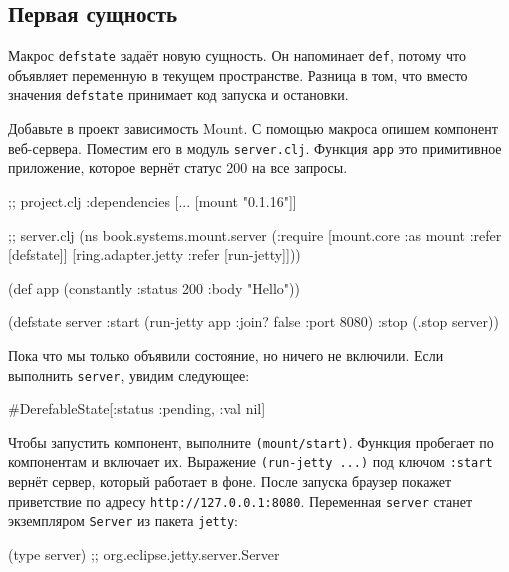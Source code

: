 \subsection{Первая сущность}


Макрос \verb|defstate| задаёт новую сущность. Он напоминает \verb|def|,
потому что объявляет переменную в текущем пространстве. Разница в том, что
вместо значения \verb|defstate| принимает код запуска и остановки.

Добавьте в проект зависимость Mount. С помощью макроса опишем компонент
веб-сервера. Поместим его в модуль \verb|server.clj|. Функция \verb|app| это
примитивное приложение, которое вернёт статус 200 на все запросы.


\begin{english}
  \begin{clojure}
;; project.clj
:dependencies [... [mount "0.1.16"]]

;; server.clj
(ns book.systems.mount.server
  (:require
   [mount.core :as mount :refer [defstate]]
   [ring.adapter.jetty :refer [run-jetty]]))

(def app (constantly {:status 200 :body "Hello"}))

(defstate server
  :start (run-jetty app {:join? false :port 8080})
  :stop (.stop server))
  \end{clojure}
\end{english}

Пока что мы только объявили состояние, но ничего не включили. Если выполнить
\verb|server|, увидим следующее:

\begin{english}
  \begin{clojure}
#DerefableState[{:status :pending, :val nil}]
  \end{clojure}
\end{english}

Чтобы запустить компонент, выполните \verb|(mount/start)|. Функция пробегает
по компонентам и включает их. Выражение \verb|(run-jetty ...)| под ключом
\verb|:start| вернёт сервер, который работает в фоне. После запуска браузер
покажет приветствие по адресу \verb|http://127.0.0.1:8080|. Переменная
\verb|server| станет экземпляром \verb|Server| из пакета \verb|jetty|:

\begin{english}
  \begin{clojure}
(type server)
;; org.eclipse.jetty.server.Server
  \end{clojure}
\end{english}

